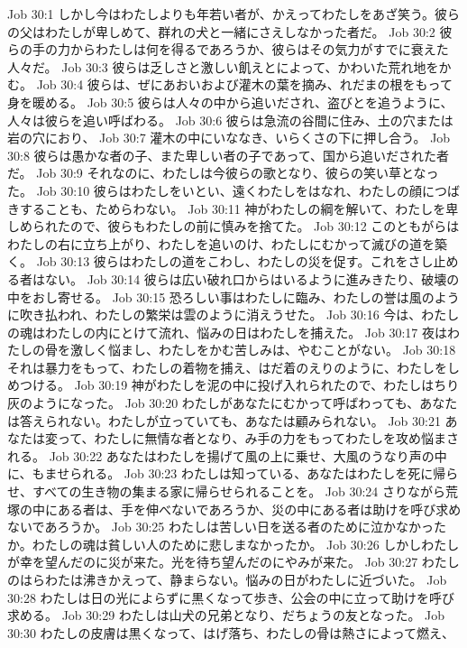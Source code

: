 Job 30:1  しかし今はわたしよりも年若い者が、かえってわたしをあざ笑う。彼らの父はわたしが卑しめて、群れの犬と一緒にさえしなかった者だ。
Job 30:2  彼らの手の力からわたしは何を得るであろうか、彼らはその気力がすでに衰えた人々だ。
Job 30:3  彼らは乏しさと激しい飢えとによって、かわいた荒れ地をかむ。
Job 30:4  彼らは、ぜにあおいおよび灌木の葉を摘み、れだまの根をもって身を暖める。
Job 30:5  彼らは人々の中から追いだされ、盗びとを追うように、人々は彼らを追い呼ばわる。
Job 30:6  彼らは急流の谷間に住み、土の穴または岩の穴におり、
Job 30:7  灌木の中にいななき、いらくさの下に押し合う。
Job 30:8  彼らは愚かな者の子、また卑しい者の子であって、国から追いだされた者だ。
Job 30:9  それなのに、わたしは今彼らの歌となり、彼らの笑い草となった。
Job 30:10  彼らはわたしをいとい、遠くわたしをはなれ、わたしの顔につばきすることも、ためらわない。
Job 30:11  神がわたしの綱を解いて、わたしを卑しめられたので、彼らもわたしの前に慎みを捨てた。
Job 30:12  このともがらはわたしの右に立ち上がり、わたしを追いのけ、わたしにむかって滅びの道を築く。
Job 30:13  彼らはわたしの道をこわし、わたしの災を促す。これをさし止める者はない。
Job 30:14  彼らは広い破れ口からはいるように進みきたり、破壊の中をおし寄せる。
Job 30:15  恐ろしい事はわたしに臨み、わたしの誉は風のように吹き払われ、わたしの繁栄は雲のように消えうせた。
Job 30:16  今は、わたしの魂はわたしの内にとけて流れ、悩みの日はわたしを捕えた。
Job 30:17  夜はわたしの骨を激しく悩まし、わたしをかむ苦しみは、やむことがない。
Job 30:18  それは暴力をもって、わたしの着物を捕え、はだ着のえりのように、わたしをしめつける。
Job 30:19  神がわたしを泥の中に投げ入れられたので、わたしはちり灰のようになった。
Job 30:20  わたしがあなたにむかって呼ばわっても、あなたは答えられない。わたしが立っていても、あなたは顧みられない。
Job 30:21  あなたは変って、わたしに無情な者となり、み手の力をもってわたしを攻め悩まされる。
Job 30:22  あなたはわたしを揚げて風の上に乗せ、大風のうなり声の中に、もませられる。
Job 30:23  わたしは知っている、あなたはわたしを死に帰らせ、すべての生き物の集まる家に帰らせられることを。
Job 30:24  さりながら荒塚の中にある者は、手を伸べないであろうか、災の中にある者は助けを呼び求めないであろうか。
Job 30:25  わたしは苦しい日を送る者のために泣かなかったか。わたしの魂は貧しい人のために悲しまなかったか。
Job 30:26  しかしわたしが幸を望んだのに災が来た。光を待ち望んだのにやみが来た。
Job 30:27  わたしのはらわたは沸きかえって、静まらない。悩みの日がわたしに近づいた。
Job 30:28  わたしは日の光によらずに黒くなって歩き、公会の中に立って助けを呼び求める。
Job 30:29  わたしは山犬の兄弟となり、だちょうの友となった。
Job 30:30  わたしの皮膚は黒くなって、はげ落ち、わたしの骨は熱さによって燃え、
